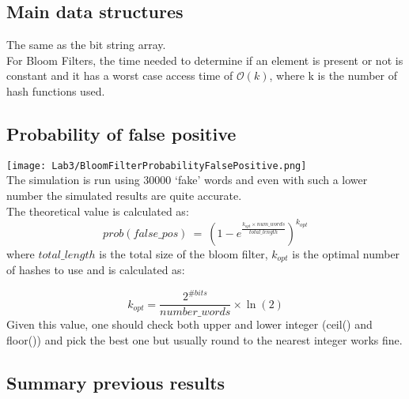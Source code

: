 \documentclass[twocolumn,letterpaper]{report}
\begin{document}
{					\subsection{Main data structures}
					The same as the bit string array. \\
			For Bloom Filters, the time needed to determine if an element is present or not is constant and it has a worst case access time of $\mathcal{O}(k)$, where k is the number of hash functions used.
					
			\subsection{Probability of false positive}
			\texttt{[image: Lab3/BloomFilterProbabilityFalsePositive.png]} \\
			The simulation is run using 30000 `fake' words and even with such a lower number the simulated results are quite accurate. \\
			The theoretical value is calculated as:
			\begin{equation} \label{eq:2}
				prob(false\_pos) \: = \: \left( 1 - e^{\frac{k_{opt} \times num\_words}{total\_length}} \right)^{k_{opt}}
			\end{equation}
			where $total\_length$ is the total size of the bloom filter, $k_{opt}$ is the optimal number of hashes to use and is calculated as: 
			
			\begin{equation} \label{eq:3}
					k_{opt} = \frac {2^{\#bits}}{number\_words} \times \ln(2)
			\end{equation}
			\noindent
			Given this value, one should check both upper and lower integer (ceil() and floor()) and pick the best one but usually round to the nearest integer works fine.
			
			
			\subsection{Summary previous results}
			
}
\end{document}
